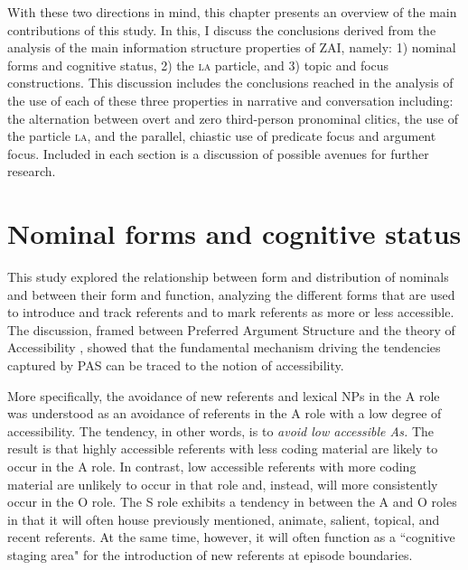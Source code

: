 With these two directions in mind, this chapter presents an overview of the main contributions of this study. In this, I discuss the conclusions derived from the analysis of the main information structure properties of ZAI, namely: 1) nominal forms and cognitive status, 2) the \textsc{la} particle, and 3) topic and focus constructions. This discussion includes the conclusions reached in the analysis of the use of each of these three properties in narrative and conversation including: the alternation between overt and zero third-person pronominal clitics, the use of the particle \textsc{la}, and the parallel, chiastic use of predicate focus and argument focus. Included in each section is a discussion of possible avenues for further research.




\section{Nominal forms and cognitive status}

This study explored the relationship between form and distribution of nominals and between their form and function, analyzing the different forms that are used to introduce and track referents and to mark referents as more or less accessible. The discussion, framed between Preferred Argument Structure \citep{dubois2003} and the theory of Accessibility \citep{ariel2001}, showed that the fundamental mechanism driving the tendencies captured by PAS can be traced to the notion of accessibility. 

More specifically, the avoidance of new referents and lexical NPs in the A role was understood as an avoidance of referents in the A role with a low degree of accessibility. The tendency, in other words, is to \textit{avoid low accessible As.} The result is that highly accessible referents with less coding material are likely to occur in the A role. In contrast, low accessible referents with more coding material are unlikely to occur in that role and, instead, will more consistently occur in the O role. The S role exhibits a tendency in between the A and O roles in that it will often house previously mentioned, animate, salient, topical, and recent referents. At the same time, however, it will often function as a ``cognitive staging area" for the introduction of new referents at episode boundaries.

